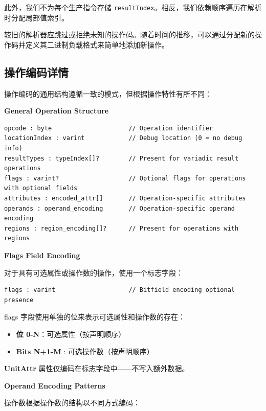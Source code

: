 \documentclass{article}
\begin{document}
此外，我们不为每个生产指令存储 \texttt{resultIndex}。相反，我们依赖顺序遍历在解析时分配局部值索引。


较旧的解析器应跳过或拒绝未知的操作码。随着时间的推移，可以通过分配新的操作码并定义其二进制负载格式来简单地添加新操作。



\subsection{操作编码详情}

操作编码的通用结构遵循一致的模式，但根据操作特性有所不同：


\textbf{General Operation Structure}


\begin{lstlisting}
opcode : byte                     // Operation identifier
locationIndex : varint            // Debug location (0 = no debug info)
resultTypes : typeIndex[]?        // Present for variadic result operations
flags : varint?                   // Optional flags for operations with optional fields
attributes : encoded_attr[]       // Operation-specific attributes
operands : operand_encoding       // Operation-specific operand encoding
regions : region_encoding[]?      // Present for operations with regions
\end{lstlisting}

\textbf{Flags Field Encoding}


对于具有可选属性或操作数的操作，使用一个标志字段：


\begin{lstlisting}
flags : varint                    // Bitfield encoding optional presence
\end{lstlisting}

flags 字段使用单独的位来表示可选属性和操作数的存在：


\begin{itemize}
\item \textbf{位 0-N}：可选属性（按声明顺序）
\item \textbf{Bits N+1-M} : 可选操作数（按声明顺序）

\end{itemize}
\textbf{UnitAttr} 属性仅编码在标志字段中------不写入额外数据。


\textbf{Operand Encoding Patterns}


操作数根据操作数的结构以不同方式编码：
\end{document}

